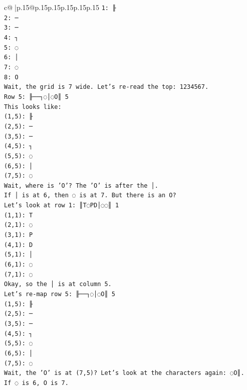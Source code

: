 \documentclass{article}
\begin{document}
{\begin{supertabular}{c@{$\;$}|p{.15\linewidth}@{}p{.15\linewidth}p{.15\linewidth}p{.15\linewidth}p{.15\linewidth}p{.15\linewidth}}
{{{\texttt{1: ╟} \\
\texttt{2: ─} \\
\texttt{3: ─} \\
\texttt{4: ┐} \\
\texttt{5: ◌} \\
\texttt{6: │} \\
\texttt{7: ◌} \\
\texttt{8: O} \\
\texttt{Wait, the grid is 7 wide. Let's re{-}read the top: 1234567.} \\
\texttt{Row 5: ╟──┐◌│◌O║ 5} \\
\texttt{This looks like:} \\
\texttt{(1,5): ╟} \\
\texttt{(2,5): ─} \\
\texttt{(3,5): ─} \\
\texttt{(4,5): ┐} \\
\texttt{(5,5): ◌} \\
\texttt{(6,5): │} \\
\texttt{(7,5): ◌} \\
\texttt{Wait, where is 'O'? The 'O' is after the │.} \\
\texttt{If │ is at 6, then ◌ is at 7. But there is an O?} \\
\texttt{Let's look at row 1: ║T◌PD│◌◌║ 1} \\
\texttt{(1,1): T} \\
\texttt{(2,1): ◌} \\
\texttt{(3,1): P} \\
\texttt{(4,1): D} \\
\texttt{(5,1): │} \\
\texttt{(6,1): ◌} \\
\texttt{(7,1): ◌} \\
\texttt{Okay, so the │ is at column 5.} \\
\texttt{Let's re{-}map row 5: ╟──┐◌│◌O║ 5} \\
\texttt{(1,5): ╟} \\
\texttt{(2,5): ─} \\
\texttt{(3,5): ─} \\
\texttt{(4,5): ┐} \\
\texttt{(5,5): ◌} \\
\texttt{(6,5): │} \\
\texttt{(7,5): ◌} \\
\texttt{Wait, the 'O' is at (7,5)? Let's look at the characters again: ◌O║.} \\
\texttt{If ◌ is 6, O is 7.} \\
}}}
\end{supertabular}}
\end{document}
